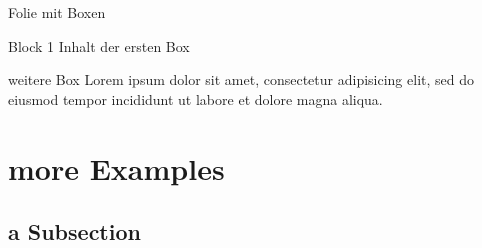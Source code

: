 \begin{frame}{Folie mit Boxen}
  \begin{block}{Block 1}
    Inhalt der ersten Box
  \end{block}
  \begin{block}{weitere Box}
    Lorem ipsum dolor sit amet, consectetur adipisicing elit, sed do eiusmod tempor incididunt ut labore et dolore magna aliqua.
  \end{block}
\end{frame}



\section{more Examples}

\subsection{a Subsection}

